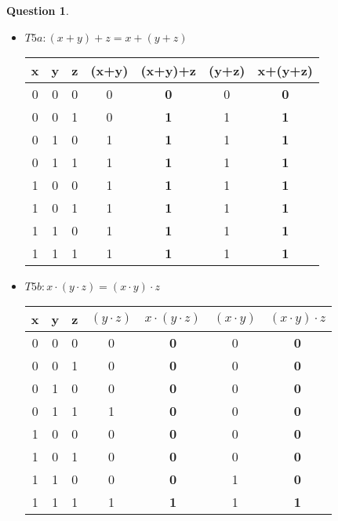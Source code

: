 \documentclass[11pt,a4paper]{article}
\theoremstyle{definition}%
\newtheorem{Q}{Question}[] %
\begin{document}
\begin{Q}
{\begin{itemize}
	\item $T5a : (x+y)+z = x + (y+z)$
	\begin{center}
		\begin{tabular}{|c|c|c|c|c|c|c|} \hline
		x & y & z & (x+y) & \textbf{(x+y)+z} & (y+z) & \textbf{x+(y+z)} \\ \hline
		0 & 0 & 0 & 0     & \textbf{0}       & 0     & \textbf{0} \\
		0 & 0 & 1 & 0     & \textbf{1}       & 1     & \textbf{1} \\
		0 & 1 & 0 & 1     & \textbf{1}       & 1     & \textbf{1} \\
		0 & 1 & 1 & 1     & \textbf{1}		 & 1	 & \textbf{1} \\
		1 & 0 & 0 & 1     & \textbf{1}		 & 1	 & \textbf{1} \\
		1 & 0 & 1 & 1	  & \textbf{1} 		 & 1 	 & \textbf{1} \\
		1 & 1 & 0 & 1	  & \textbf{1} 		 & 1	 & \textbf{1} \\
		1 & 1 & 1 & 1	  & \textbf{1}		 & 1 	 & \textbf{1} \\ \hline
		\end{tabular}
	\end{center}

	\item $T5b : x \cdot (y \cdot z) = (x \cdot y) \cdot z$
	\begin{center}
		\begin{tabular}{|c|c|c|c|c|c|c|} \hline
		x & y & z & $(y \cdot z)$ & \textbf{$x \cdot (y \cdot z)$} & $(x \cdot y)$ & \textbf{$(x \cdot y) \cdot z$} \\ \hline
		0 & 0 & 0 & 0           & \textbf{0}                   & 0           & \textbf{0} \\
		0 & 0 & 1 & 0           & \textbf{0}                   & 0           & \textbf{0} \\
		0 & 1 & 0 & 0           & \textbf{0}                   & 0           & \textbf{0} \\
		0 & 1 & 1 & 1           & \textbf{0}                   & 0           & \textbf{0} \\
		1 & 0 & 0 & 0           & \textbf{0}                   & 0           & \textbf{0} \\
		1 & 0 & 1 & 0           & \textbf{0}                   & 0           & \textbf{0} \\
		1 & 1 & 0 & 0           & \textbf{0}                   & 1           & \textbf{0} \\
		1 & 1 & 1 & 1           & \textbf{1}                   & 1           & \textbf{1} \\ \hline
		\end{tabular}
	\end{center}


\end{itemize}}
\end{Q}
\end{document}
